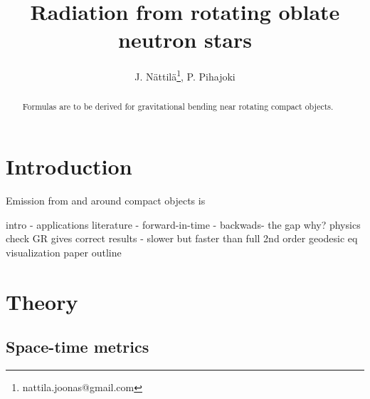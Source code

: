 \documentclass[iop, usenatbib]{emulateapj}
\begin{document}
\title{Radiation from rotating oblate neutron stars}

\author{J. N\"attil\"a\thanks{nattila.joonas@gmail.com},
  P. Pihajoki}

\affil{}


\begin{abstract}
Formulas are to be derived for gravitational bending near rotating compact objects.
\end{abstract}

\section{Introduction}
Emission from and around compact objects is

intro 
    - applications
literature
    - forward-in-time
    - backwads-
the gap
why?
    physics check
    GR gives correct results
    - slower but faster than full 2nd order geodesic eq
    visualization
paper outline


\clearpage



\section{Theory}

\subsection{Space-time metrics}
\end{document}
